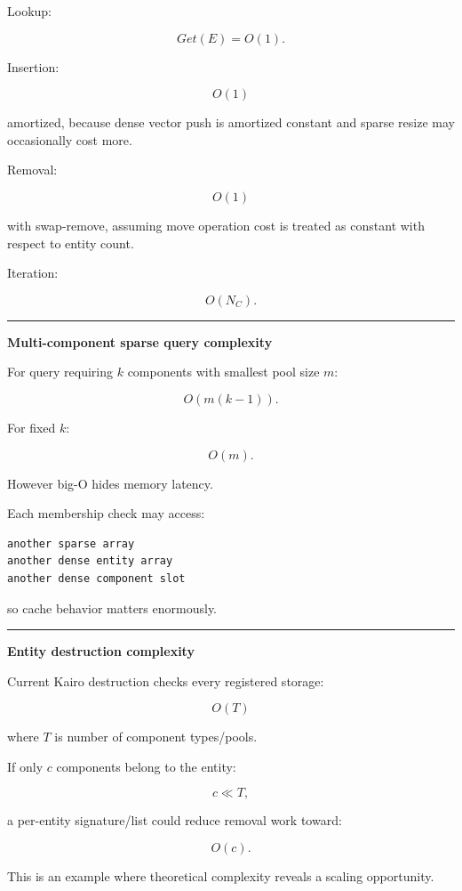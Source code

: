 Lookup:

\[
Get(E)=O(1).
\]

Insertion:

\[
O(1)
\]

amortized, because dense vector push is amortized constant and sparse resize may occasionally cost more.

Removal:

\[
O(1)
\]

with swap-remove, assuming move operation cost is treated as constant with respect to entity count.

Iteration:

\[
O(N_C).
\]

\begin{center}\rule{0.5\linewidth}{0.5pt}\end{center}

\textbf{Multi-component sparse query complexity}

For query requiring \(k\) components with smallest pool size \(m\):

\[
\boxed{
O(m(k-1)).
}
\]

For fixed \(k\):

\[
O(m).
\]

However big-O hides memory latency.

Each membership check may access:

\begin{verbatim}
another sparse array
another dense entity array
another dense component slot
\end{verbatim}

so cache behavior matters enormously.

\begin{center}\rule{0.5\linewidth}{0.5pt}\end{center}

\textbf{Entity destruction complexity}

Current Kairo destruction checks every registered storage:

\[
O(T)
\]

where \(T\) is number of component types/pools.

If only \(c\) components belong to the entity:

\[
c\ll T,
\]

a per-entity signature/list could reduce removal work toward:

\[
O(c).
\]

This is an example where theoretical complexity reveals a scaling opportunity.

